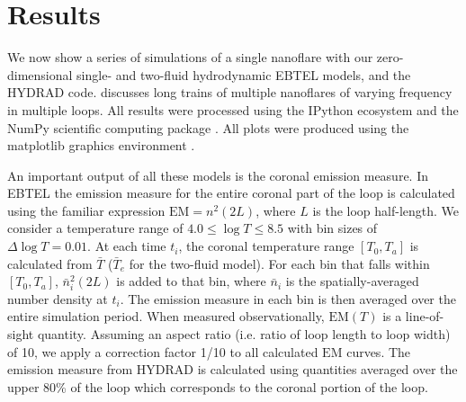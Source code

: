 \documentclass[apj]{emulateapj}
\begin{document}
	\section{Results}
	\label{sec:results}
	\par We now show a series of simulations of a single nanoflare with our zero-dimensional single- and two-fluid hydrodynamic EBTEL models, and the HYDRAD code.  discusses long trains of multiple nanoflares of varying frequency in multiple loops. All results were processed using the IPython ecosystem and the NumPy scientific computing package \citep{perez_ipython:_2007,van_der_walt_numpy_2011}. All plots were produced using the matplotlib graphics environment \citep{hunter_matplotlib:_2007}.
	\par An important output of all these models is the coronal emission measure. In EBTEL the emission measure for the entire coronal part of the loop is calculated using the familiar expression $\mathrm{EM}=n^2(2L)$, where $L$ is the loop half-length. We consider a temperature range of $4.0\le\log{T}\le8.5$ with bin sizes of $\Delta\log{T}=0.01$. At each time $t_i$, the coronal temperature range $[T_0,T_a]$ is calculated from $\bar{T}$ ($\bar{T}_e$ for the two-fluid model). For each bin that falls within $[T_0,T_a]$, $\bar{n}_i^2(2L)$ is added to that bin, where $\bar{n}_i$ is the spatially-averaged number density at $t_i$. The emission measure in each bin is then averaged over the entire simulation period. When measured observationally, $\mathrm{EM}(T)$ is a line-of-sight quantity. Assuming an aspect ratio (i.e. ratio of loop length to loop width) of 10, we apply a correction factor 1/10 to all calculated $\mathrm{EM}$ curves. The emission measure from HYDRAD is calculated using quantities averaged over the upper 80\% of the loop which corresponds to the coronal portion of the loop.
\end{document}

